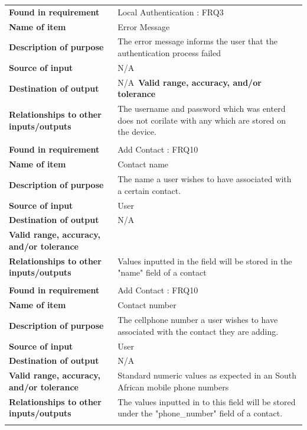 \newpage
\begin{tabular}{ll}
\textbf{Found in requirement}&Local Authentication : FRQ3\\
\textbf{Name of item}&Error Message\\
\textbf{Description of purpose}&The error message informs the user that the authentication process failed\\
\textbf{Source of input}&N/A\\
\textbf{Destination of output}&N/A\
\textbf{Valid range, accuracy, and/or tolerance}&\\
\textbf{Relationships to other inputs/outputs}&The username and password which was enterd does not corilate with any which are stored on the device.\\
&\\
\textbf{Found in requirement}&Add Contact : FRQ10\\
\textbf{Name of item}&Contact name\\
\textbf{Description of purpose}&The name a user wishes to have associated with a certain contact.\\
\textbf{Source of input}&User\\
\textbf{Destination of output}&N/A\\
\textbf{Valid range, accuracy, and/or tolerance}&\\
\textbf{Relationships to other inputs/outputs}&Values inputted in the field will be stored in the "name" field of a contact\\
&\\
\textbf{Found in requirement}&Add Contact : FRQ10\\
\textbf{Name of item}&Contact number\\
\textbf{Description of purpose}&The cellphone number a user wishes to have associated with the contact they are adding.\\
\textbf{Source of input}&User\\
\textbf{Destination of output}&N/A\\
\textbf{Valid range, accuracy, and/or tolerance}&Standard numeric values as expected in an South African mobile phone numbers\\
\textbf{Relationships to other inputs/outputs}&The values inputted in to this field will be stored under the "phone_number" field of a contact.\\
&\\

\end{tabular}
